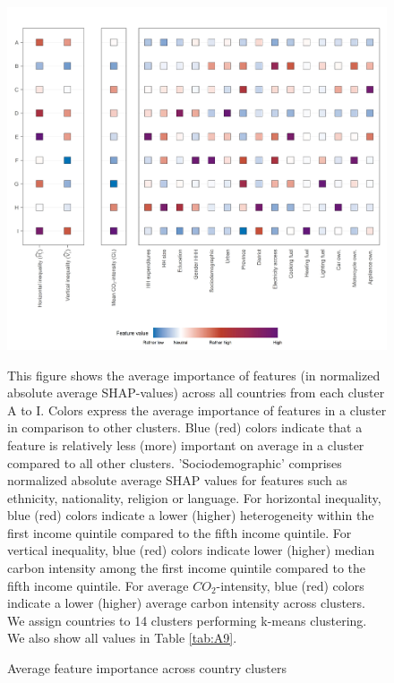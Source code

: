 \documentclass[12pt, a4paper]{article}
\newenvironment{subcaption}
{\strut
\vspace{-5pt}
\begin{minipage}[b]{0.9\textwidth}
  \hspace*{-\parindent}
  \footnotesize}
 {\end{minipage}}
\begin{document}
\begin{figure}[ht!]
    \centering
    \includegraphics{1_Figures/Figure 3/Figure_3_Corrected.jpg}
    \caption{Average feature importance across country clusters}
    \label{fig:fig_3}
    \begin{subcaption}
    This figure shows the average importance of features (in normalized absolute average SHAP-values) across all countries from each cluster A to I. Colors express the average importance of features in a cluster in comparison to other clusters. Blue (red) colors indicate that a feature is relatively less (more) important on average in a cluster compared to all other clusters. 'Sociodemographic' comprises normalized absolute average SHAP values for features such as ethnicity, nationality, religion or language.
    For horizontal inequality, blue (red) colors indicate a lower (higher) heterogeneity within the first income quintile compared to the fifth income quintile. For vertical inequality, blue (red) colors indicate lower (higher) median carbon intensity among the first income quintile compared to the fifth income quintile. For average $CO_{2}$-intensity, blue (red) colors indicate a lower (higher) average carbon intensity across clusters. We assign countries to 14 clusters performing k-means clustering. We also show all values in Table \ref{tab:A9}.
    \end{subcaption}
\end{figure}
\end{document}
